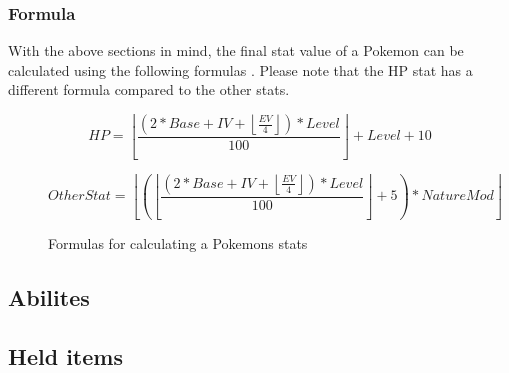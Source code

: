 \subsubsection{Formula}
With the above sections in mind, the final stat value of a Pokemon can be calculated using the following formulas \cite{PokemonStats}.
Please note that the HP stat has a different formula compared to the other stats.

\begin{figure}
  $$
    HP = \left\lfloor \frac{(2 * Base + IV + \left\lfloor \frac{EV}{4} \right\rfloor) * Level}{100} \right\rfloor + Level + 10
  $$
  
  $$
    OtherStat = \left\lfloor \left( \left\lfloor \frac{(2 * Base + IV + \left\lfloor \frac{EV}{4} \right\rfloor) * Level}{100} \right\rfloor + 5 \right) * NatureMod \right\rfloor
  $$
  \label{formula:stat-formula}
  \caption{Formulas for calculating a Pokemons stats \cite{PokemonStats}}
\end{figure}

\subsection{Abilites}
\subsection{Held items}
